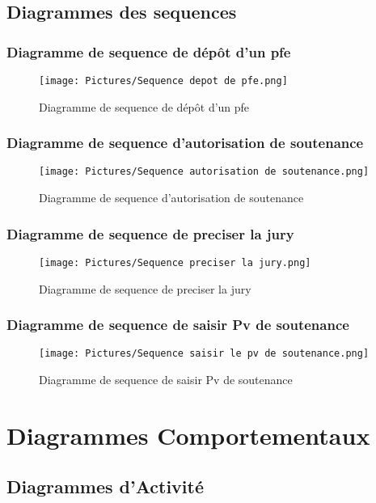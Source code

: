 \documentclass[11pt,fleqn]{book} %
\begin{document}
\subsection{Diagrammes des sequences}
\subsubsection{Diagramme de sequence de dépôt d'un pfe}
\begin{figure}[h]
    \centering
    \texttt{[image: Pictures/Sequence depot de pfe.png]}
    \caption{Diagramme de sequence de dépôt d'un pfe}
    \label{fig:pca}
\end{figure}
\newpage

\subsubsection{Diagramme de sequence d'autorisation de soutenance}
\begin{figure}[h]
    \centering
    \texttt{[image: Pictures/Sequence autorisation de soutenance.png]}
    \caption{Diagramme de sequence d'autorisation de soutenance}
    \label{fig:pca}
\end{figure}
\newpage
\subsubsection{Diagramme de sequence de preciser la jury}
\begin{figure}[h]
    \centering
    \texttt{[image: Pictures/Sequence preciser la jury.png]}
    \caption{Diagramme de sequence de preciser la jury}
    \label{fig:pca}
\end{figure}
\newpage

\subsubsection{Diagramme de sequence de saisir Pv de soutenance}
\begin{figure}[h]
    \centering
    \texttt{[image: Pictures/Sequence saisir le pv de soutenance.png]}
    \caption{Diagramme de sequence de saisir Pv de soutenance}
    \label{fig:pca}
\end{figure}
\newpage
\section{Diagrammes Comportementaux}
\subsection{Diagrammes d’Activité}
\end{document}
